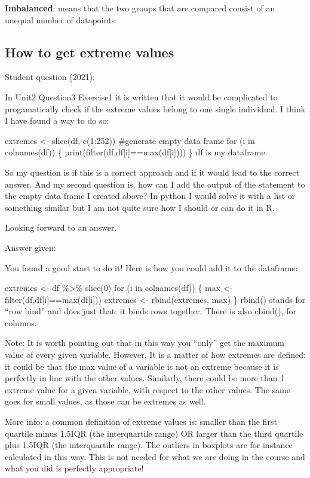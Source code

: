 \documentclass[
  letterpaper,
  8pt,
  a4paper]{book}
\begin{document}
\textbf{Imbalanced}: means that the two groups that are compared consist
of an unequal number of datapoints

\subsection*{How to get extreme values}\label{how-to-get-extreme-values}

Student question (2021):

In Unit2 Question3 Exercise1 it is written that it would be complicated
to progamatically check if the extreme values belong to one single
individual. I think I have found a way to do so:

extremes \textless- slice(df,-c(1:252)) \#generate empty data frame for
(i in colnames(df)) \{ print(filter(df,df{[}i{]}==max(df{[}i{]}))) \} df
is my dataframe.

So my question is if this is a correct approach and if it would lead to
the correct answer. And my second question is, how can I add the output
of the statement to the empty data frame I created above? In python I
would solve it with a list or something similar but I am not quite sure
how I should or can do it in R.

Looking forward to an answer.

Answer given:

You found a good start to do it! Here is how you could add it to the
dataframe:

extremes \textless- df \%\textgreater\% slice(0) for (i in colnames(df))
\{ max \textless- filter(df,df{[}i{]}==max(df{[}i{]})) extremes
\textless- rbind(extremes, max) \} rbind() stands for ``row bind'' and
does just that: it binds rows together. There is also cbind(), for
columns.

Note: It is worth pointing out that in this way you ``only'' get the
maximum value of every given variable. However, It is a matter of how
extremes are defined: it could be that the max value of a variable is
not an extreme because it is perfectly in line with the other values.
Similarly, there could be more than 1 extreme value for a given
variable, with respect to the other values. The same goes for small
values, as those can be extremes as well.

More info: a common definition of extreme values is: smaller than the
first quartile minus 1.5IQR (the interquartile range) OR larger than the
third quartile plus 1.5IQR (the interquartile range). The outliers in
boxplots are for instance calculated in this way. This is not needed for
what we are doing in the course and what you did is perfectly
appropriate!
\end{document}
